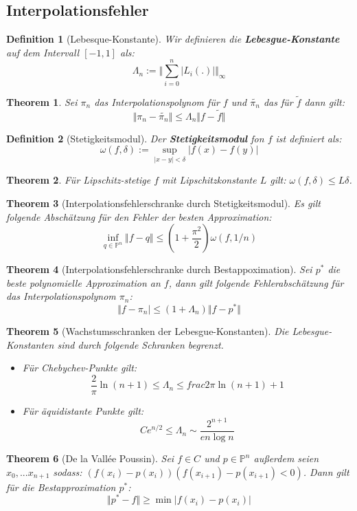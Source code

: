 \documentclass[10pt,a4paper]{article}
\newtheorem{theorem}{Theorem}
\newtheorem{definition}{Definition}
\begin{document}
	\subsection{Interpolationsfehler}
	\begin{definition}[Lebesque-Konstante]
		Wir definieren die \textbf{Lebesgue-Konstante} auf dem Intervall $[-1, 1]$ als:
		$$\Lambda_n := \Vert\sum_{i=0}^n|L_i(.)|\Vert_\infty$$
	\end{definition}
	\begin{theorem}
		Sei $\pi_n$ das Interpolationspolynom für $f$ und $\tilde{\pi_n}$ das für $\tilde{f}$ dann gilt:
		$$\Vert\pi_n-\tilde{\pi_n}\Vert \leq \Lambda_n\Vert f- \tilde{f}\Vert$$
	\end{theorem}
	\begin{definition}[Stetigkeitsmodul]
		Der \textbf{Stetigkeitsmodul} fon $f$ ist definiert als:
		$$\omega(f, \delta) := \sup_{|x-y|<\delta}|f(x)-f(y)|$$
	\end{definition}
	\begin{theorem}
		Für Lipschitz-stetige $f$ mit Lipschitzkonstante $L$ gilt: $\omega(f, \delta) \leq L\delta$.
	\end{theorem}
	\begin{theorem}[Interpolationsfehlerschranke durch Stetigkeitsmodul]
		Es gilt folgende Abschätzung für den Fehler der besten Approximation:
		$$\inf_{q\in \mathbb{P}^n}\Vert f-q\Vert \leq (1+\frac{\pi^2}{2})\omega(f, 1/n)$$
	\end{theorem}
	\begin{theorem}[Interpolationsfehlerschranke durch Bestappoximation]
		Sei $p^*$ die beste polynomielle Approximation an $f$, dann gilt folgende Fehlerabschätzung für das Interpolationspolynom $\pi_n$:
		$$\Vert f-\pi_n\vert \leq (1+\Lambda_n)\Vert f- p^*\Vert$$
	\end{theorem}	
	\begin{theorem}[Wachstumsschranken der Lebesgue-Konstanten]
		Die Lebesgue-Konstanten sind durch folgende Schranken begrenzt.
		\begin{itemize}
			\item Für Chebychev-Punkte gilt: 
			$$\frac{2}{\pi}\ln(n+1) \leq \Lambda_n \leq frac{2}{\pi}\ln(n+1)+1$$
			\item Für äquidistante Punkte gilt:
			$$Ce^{n/2}\leq \Lambda_n \sim \frac{2^{n+1}}{en\log n}$$
		\end{itemize}
	\end{theorem}
	\begin{theorem}[De la Vallée Poussin]
		Sei $f\in C$ und $p\in \mathbb{P}^n$ außerdem seien $x_0, ... x_{n+1}$ sodass: $(f(x_i)-p(x_i))(f(x_{i+1})- p(x_{i+1}) < 0)$. Dann gilt für die Bestapproximation $p^*$:
		$$\Vert p^*-f\Vert\geq \min |f(x_i)- p(x_i)|$$
	\end{theorem}
\end{document}
